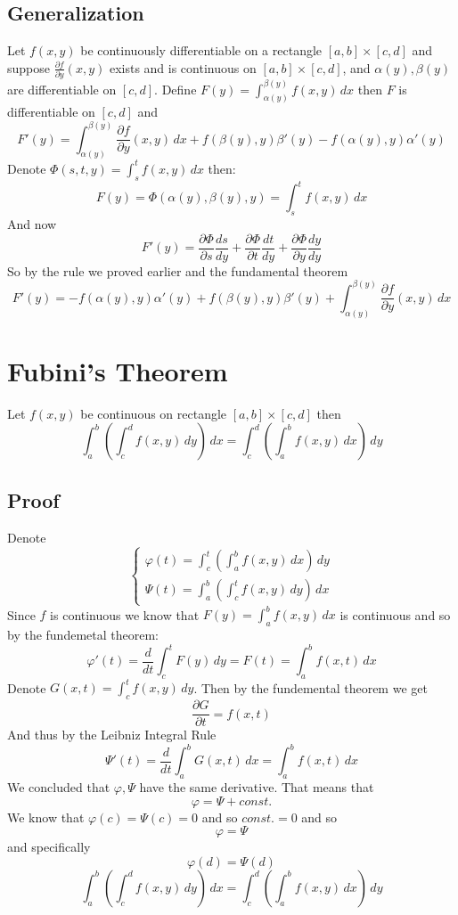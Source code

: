 \documentclass[11pt,a4paper]{article}
\theoremstyle{definition}
\theoremstyle{plain}
\begin{document}
	\newpage
	
	\subsection{Generalization}
	Let $f(x,y)$ be continuously differentiable on a rectangle $[a,b]\times[c,d]$ and suppose $\frac{\partial f}{\partial y}(x,y)$ exists and is continuous on $[a,b]\times[c,d]$, and $\alpha(y),\beta(y)$ are differentiable on $[c,d]$. Define $F(y) = \int_{\alpha(y)}^{\beta(y)}{f(x,y)}\,dx$ then $F$ is differentiable on $[c,d]$ and
	\[
		F'(y) = \int_{\alpha(y)}^{\beta(y)}{\frac{\partial f}{\partial y}(x,y)\, dx} + f(\beta(y),y)\beta'(y) - f(\alpha(y),y)\alpha'(y)
	\]
	Denote $\Phi(s,t,y) = \int_s^t{f(x,y)\,dx}$ then:
	\[
		F(y) = \Phi(\alpha(y),\beta(y),y) = 	\int_s^t{f(x,y)\,dx}
	\]
	And now
	\[
		F'(y) = \frac{\partial\Phi}{\partial s}\frac{ds}{dy}
	+\frac{\partial\Phi}{\partial t}\frac{dt}{dy}
	+\frac{\partial\Phi}{\partial y}\frac{dy}{dy}
	\]
	So by the rule we proved earlier and the fundamental theorem
	\[
		F'(y) = 						 -f(\alpha(y),y)\alpha'(y)
	+f(\beta(y),y)\beta'(y)
	+\int_{\alpha(y)}^{\beta(y)}{\frac{\partial f}{\partial y}(x,y)\, dx}
	\]

	\newpage
	\section{Fubini's Theorem}
	Let $f(x,y)$ be continuous on rectangle $[a,b]\times[c,d]$ then
	\[	\int_a^b\left(\int_c^d{f(x,y)\, dy}\right)\,dx
	= \int_c^d\left(\int_a^b{f(x,y)\, dx}\right)\,dy
	\]
	\subsection{Proof}
	Denote
	$$
	\begin{cases}
		\varphi(t) = \int_c^t\left(\int_a^b{f(x,y)\, dx}\right)\,dy \\
		\Psi(t) = \int_a^b\left(\int_c^t{f(x,y)\, dy}\right)\,dx
	\end{cases}
	$$
	Since $f$ is continuous we know that $F(y) = \int_a^b{f(x,y)\,dx}$ is continuous and so by the fundemetal theorem:
	\[
		\varphi'(t) = \frac{d}{dt}\int_c^t{F(y)}\,dy = F(t) = \int_a^b{f(x,t)}\,dx
	\]
	Denote $G(x,t) = \int_c^t{f(x,y)\,dy}$. Then by the fundemental theorem we get
	\[
		\frac{\partial G}{\partial t} = f(x,t)
	\]
	And thus by the Leibniz Integral Rule
	\[
		\Psi'(t) = \frac{d}{dt}\int_a^b{G(x,t)\,dx} = \int_a^b{f(x,t)\,dx}
	\]
	We concluded that $\varphi,\Psi$ have the same derivative. That means that $$\varphi = \Psi + const.$$
	We know that $\varphi(c) = \Psi(c) = 0$ and so $const.=0$ and so
	\[
		\varphi = \Psi
	\]
	and specifically
	\[
		\varphi(d) = \Psi(d)
	\]
	\[	\int_a^b\left(\int_c^d{f(x,y)\, dy}\right)\,dx
	= \int_c^d\left(\int_a^b{f(x,y)\, dx}\right)\,dy
	\]
\end{document}
